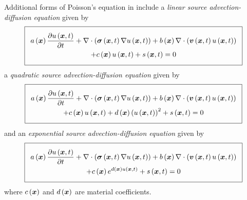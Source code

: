 Additional forms of Poisson's equation in \OpenCMISS include a \emph{linear
  source advection-diffusion equation} given by
\begin{equation}
  \addtolength{\fboxsep}{5pt}
  \boxed{
    \begin{gathered}
      \fnof{a}{\vectr{x}}\delby{\fnof{u}{\vectr{x},t}}{t}+\divergence{}{\pbrac{\fnof{\tensor{\sigma}}{\vectr{x},t}
          \gradient{}{\fnof{u}{\vectr{x},t}}}}+\fnof{b}{\vectr{x}}\divergence{}{\pbrac{\fnof{\vectr{v}}{\vectr{x},t}
          \fnof{u}{\vectr{x},t}}}\\
      +\fnof{c}{\vectr{x}}\fnof{u}{\vectr{x},t}+\fnof{s}{\vectr{x},t}=0
    \end{gathered}
  } 
  \label{eqn:LinearSourceAdvectionDiffusionEquation}
\end{equation}
a \emph{quadratic source advection-diffusion equation} given by
\begin{equation}
  \addtolength{\fboxsep}{5pt}
  \boxed{
    \begin{gathered}
      \fnof{a}{\vectr{x}}\delby{\fnof{u}{\vectr{x},t}}{t}+\divergence{}{\pbrac{\fnof{\tensor{\sigma}}{\vectr{x},t}
          \gradient{}{\fnof{u}{\vectr{x},t}}}}+\fnof{b}{\vectr{x}}\divergence{}{\pbrac{\fnof{\vectr{v}}{\vectr{x},t}
          \fnof{u}{\vectr{x},t}}}\\
      +\fnof{c}{\vectr{x}}\fnof{u}{\vectr{x},t}+\fnof{d}{\vectr{x}}\pbrac{\fnof{u}{\vectr{x},t}}^{2}+
      \fnof{s}{\vectr{x},t}=0
    \end{gathered}
  }
  \label{eqn:QuadraticSourceAdvectionDiffusionEquation}
\end{equation}
and an \emph{exponential source advection-diffusion equation} given by
\begin{equation}
  \addtolength{\fboxsep}{5pt}
  \boxed{
    \begin{gathered}
      \fnof{a}{\vectr{x}}\delby{\fnof{u}{\vectr{x},t}}{t}+\divergence{}{\pbrac{\fnof{\tensor{\sigma}}{\vectr{x},t}
          \gradient{}{\fnof{u}{\vectr{x},t}}}}+\fnof{b}{\vectr{x}}\divergence{}{\pbrac{\fnof{\vectr{v}}{\vectr{x},t}
          \fnof{u}{\vectr{x},t}}}\\
      +\fnof{c}{\vectr{x}}e^{\fnof{d}{\vectr{x}}\fnof{u}{\vectr{x},t}}+\fnof{s}{\vectr{x},t}=0
    \end{gathered}
  }
  \label{eqn:ExponentialSourceAdvectionDiffusionEquation}
\end{equation}
where $ c\left( \boldsymbol{x} \right) $ and $ d\left( \boldsymbol{x} \right) $ are material
coefficients.

